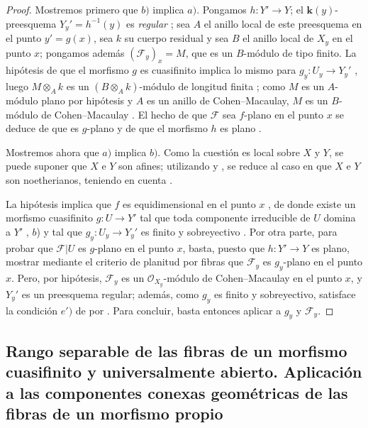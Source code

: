 \begin{proof}
\label{IV.15.4.3-proof}
Mostremos primero que $b)$ implica $a)$.
Pongamos $h:Y'\to Y$; el $\boldsymbol{k}(y)$-preesquema $Y_y'=h^{-1}(y)$ es \emph{regular} ; sea $A$ el anillo local de este preesquema en el punto $y'=g(x)$, sea $k$ su cuerpo residual y sea $B$ el anillo local de $X_y$ en el punto $x$; pongamos además $(\mathcal F_y)_x=M$, que es un $B$-módulo de tipo finito.
La hipótesis de que el morfismo $g$ es cuasifinito implica lo mismo para $g_y:U_y\to Y_y'$ , luego $M\otimes_A k$ es un $(B\otimes_A k)$-módulo de longitud finita ; como $M$ es un $A$-módulo plano por hipótesis y $A$ es un anillo de Cohen--Macaulay, $M$ es un $B$-módulo de Cohen--Macaulay .
El hecho de que $\mathcal F$ sea $f$-plano en el punto $x$ se deduce de que es $g$-plano y de que el morfismo $h$ es plano .

Mostremos ahora que $a)$ implica $b)$.
Como la cuestión es local sobre $X$ y $Y$, se puede suponer que $X$ e $Y$ son afines; utilizando  y , se reduce al caso en que $X$ e $Y$ son noetherianos, teniendo en cuenta .

La hipótesis implica que $f$ 
es equidimensional en el punto $x$ , de donde existe un morfismo cuasifinito $g:U\to Y'$ tal que toda componente irreducible de $U$ domina a $Y'$ , $b$) y tal que $g_y:U_y\to Y_y'$ es finito y sobreyectivo .
Por otra parte, para probar que $\mathcal F|U$ es $g$-plano en el punto $x$, basta, puesto que $h:Y'\to Y$ es plano, mostrar mediante el criterio de planitud por fibras  que $\mathcal F_y$ es $g_y$-plano en el punto $x$.
Pero, por hipótesis, $\mathcal F_y$ es un $\mathcal O_{X_y}$-módulo de Cohen--Macaulay en el punto $x$, y $Y_y'$ es un preesquema regular; además, como $g_y$ es finito y sobreyectivo, satisface la condición $e')$ de  por .
Para concluir, basta entonces aplicar  a $g_y$ y $\mathcal F_y$.
\end{proof}
\subsection{Rango separable de las fibras de un morfismo cuasifinito y universalmente abierto. Aplicación a las componentes conexas geométricas de las fibras de un morfismo propio}
\label{subsection:IV.15.5}

